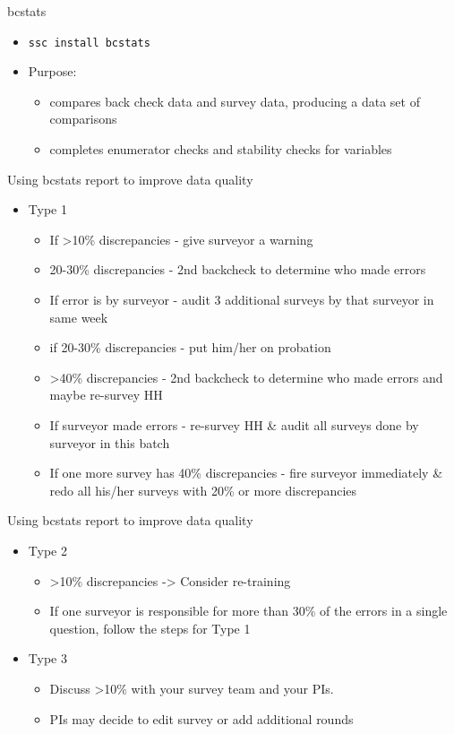\documentclass[aspectratio=169]{beamer}
\begin{document}
\begin{frame}{bcstats}
	\begin{itemize}
		\item \texttt{ssc install bcstats}
		\item Purpose:
		\begin{itemize}
			\item compares back check data and survey data, producing a data set of comparisons
			\item completes enumerator checks and stability checks for variables
		\end{itemize}
	\end{itemize}
\end{frame}

\begin{frame}{Using bcstats report to improve data quality}
	\begin{itemize}
		\item Type 1
			\begin{itemize}
				\item If >10\% discrepancies  - give surveyor a warning
				\item 20-30\% discrepancies - 2nd backcheck to determine who made errors
				\item If error is by surveyor  - audit 3 additional surveys by that surveyor in same week
				\item if 20-30\% discrepancies -  put him/her on probation
				\item >40\% discrepancies - 2nd backcheck to determine who made errors and maybe re-survey HH
				\item If surveyor made errors - re-survey HH \& audit all surveys done by surveyor in this batch
				\item If one more survey has 40\% discrepancies - fire surveyor immediately \& redo all his/her surveys with 20\% or more discrepancies
		\end{itemize}
	\end{itemize}
\end{frame}

\begin{frame}{Using bcstats report to improve data quality}
	\begin{itemize}
		\item Type 2
		\begin{itemize}
			\item >10\% discrepancies -> Consider re-training
			\item If one surveyor is responsible for more than 30\% of the errors in a single question, follow the steps for Type 1
		\end{itemize}
		\item Type 3
		\begin{itemize}
			\item Discuss >10\% with your survey team and your PIs.
			\item PIs may decide to edit survey or add additional rounds
		\end{itemize}
	\end{itemize}
\end{frame}
\end{document}
